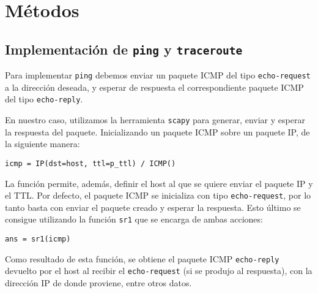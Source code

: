 \section{M\'etodos}
 
 \subsection{Implementaci\'on de \texttt{ping} y \texttt{traceroute}}
 
 Para implementar \texttt{ping} debemos enviar un paquete ICMP del tipo \texttt{echo-request} a la direcci\'on deseada, y esperar de respuesta el correspondiente paquete ICMP del tipo \texttt{echo-reply}.
 
 En nuestro caso, utilizamos la herramienta \texttt{scapy} para generar, enviar y esperar la respuesta del paquete. Inicializando un paquete ICMP sobre un paquete IP, de la siguiente manera:\\
 
 \begin{center}
    \texttt{icmp = IP(dst=host, ttl=p\_ttl) / ICMP()}
 \end{center}
 
 La funci\'on permite, además, definir el host al que se quiere enviar el paquete IP y el TTL. Por defecto, el paquete ICMP se inicializa con tipo \texttt{echo-request}, por lo tanto basta con enviar el paquete creado y esperar la respuesta. Esto \'ultimo se consigue utilizando la funci\'on \texttt{sr1} que se encarga de ambas acciones:
 
 \begin{center}
    \texttt{ans = sr1(icmp)}
 \end{center}
 
 Como resultado de esta funci\'on,  se obtiene el paquete ICMP  \texttt{echo-reply} devuelto por el host al recibir el \texttt{echo-request} (si se produjo al respuesta), con la direcci\'on IP de donde proviene, entre otros datos.\\
  
 
